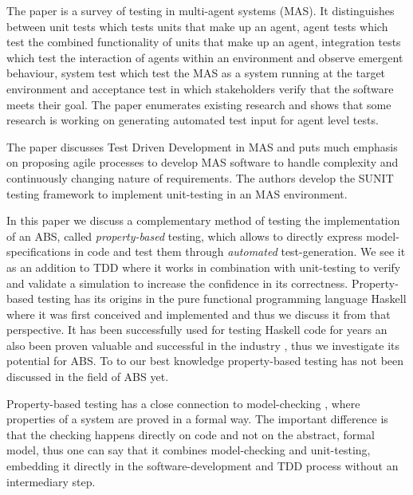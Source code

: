 The paper \cite{nguyen_testing_2011} is a survey of testing in multi-agent systems (MAS). It distinguishes between unit tests which tests units that make up an agent, agent tests which test the combined functionality of units that make up an agent, integration tests which test the interaction of agents within an environment and observe emergent behaviour, system test which test the MAS as a system running at the target environment and acceptance test in which stakeholders verify that the software meets their goal. The paper enumerates existing research and shows that some research is working on generating automated test input for agent level tests.

The paper \cite{tiryaki_sunit:_2007} discusses Test Driven Development in MAS and puts much emphasis on proposing agile processes to develop MAS software to handle complexity and continuously changing nature of requirements. The authors develop the SUNIT testing framework to implement unit-testing in an MAS environment.

In this paper we discuss a complementary method of testing the implementation of an ABS, called \textit{property-based} testing, which allows to directly express model-specifications in code and test them through \textit{automated} test-generation. We see it as an addition to TDD where it works in combination with unit-testing to verify and validate a simulation to increase the confidence in its correctness. Property-based testing has its origins \cite{claessen_quickcheck:_2000, claessen_testing_2002, runciman_smallcheck_2008} in the pure functional programming language Haskell \cite{hudak_history_2007} where it was first conceived and implemented and thus we discuss it from that perspective. It has been successfully used for testing Haskell code for years an also been proven valuable and successful in the industry \cite{hughes_quickcheck_2007}, thus we investigate its potential for ABS. To to our best knowledge property-based testing has not been discussed in the field of ABS yet. 

Property-based testing has a close connection to model-checking \cite{mcmillan_symbolic_1993}, where properties of a system are proved in a formal way. The important difference is that the checking happens directly on code and not on the abstract, formal model, thus one can say that it combines model-checking and unit-testing, embedding it directly in the software-development and TDD process without an intermediary step.

